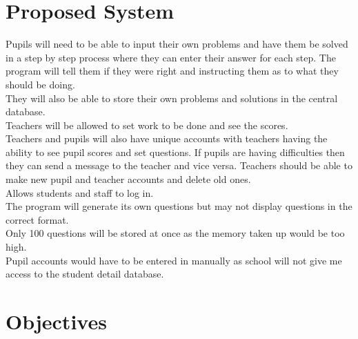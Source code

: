 \documentclass[a4paper,12pt]{report}
\begin{document}
\clearpage
\section{Proposed System}        

Pupils will need to be able to input their own problems and have them be solved in a step by step process where they can enter their answer for each step. The program will tell them if they were right and instructing them as to what they should be doing.\\
 They will also be able to store their own problems and solutions in the central database.\\
 Teachers will be allowed to set work to be done and see the scores.\\
 Teachers and pupils will also have unique accounts with teachers having the ability to see pupil scores and set questions. If pupils are having difficulties then they can send a message to the teacher and vice versa. Teachers should be able to make new pupil and teacher accounts and delete old ones.\\
 Allows students and staff to log in.\\
 The program will generate its own questions but may not display questions in the correct format.\\
 Only 100 questions will be stored at once as the memory taken up would be too high.\\
 Pupil accounts would have to be entered in manually as school will not give me access to the student detail database.\\

\section{Objectives}
\end{document}
